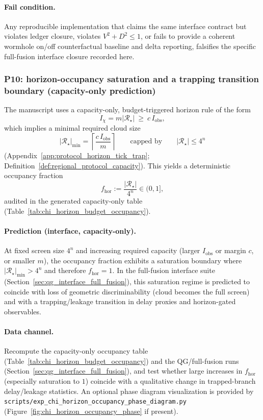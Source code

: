 \paragraph{Fail condition.}
Any reproducible implementation that claims the same interface contract but violates ledger closure, violates $V^2+D^2\le 1$, or fails to provide a coherent wormhole on/off counterfactual baseline and delta reporting,
falsifies the specific full-fusion interface closure recorded here.

\subsubsection{P10: horizon-occupancy saturation and a trapping transition boundary (capacity-only prediction)}
\label{subsec:p10_horizon_saturation_trapping}
The manuscript uses a capacity-only, budget-triggered horizon rule of the form
\[
I_{\chi}=m|\mathcal{R}_\star|\ \ge\ c\,I_{\mathrm{obs}},
\]
which implies a minimal required cloud size
\[
|\mathcal{R}_\star|_{\min}=\left\lceil \frac{c\,I_{\mathrm{obs}}}{m}\right\rceil
\qquad\text{capped by}\qquad
|\mathcal{R}_\star|\le 4^n
\]
(Appendix~\ref{app:protocol_horizon_tick_trap}; Definition~\ref{def:regional_protocol_capacity}).
This yields a deterministic occupancy fraction
\[
f_{\mathrm{hor}}:=\frac{|\mathcal{R}_\star|}{4^n}\in(0,1],
\]
audited in the generated capacity-only table (Table~\ref{tab:chi_horizon_budget_occupancy}).

\paragraph{Prediction (interface, capacity-only).}
At fixed screen size $4^n$ and increasing required capacity (larger $I_{\mathrm{obs}}$ or margin $c$, or smaller $m$), the occupancy fraction exhibits a saturation boundary where $|\mathcal{R}_\star|_{\min}>4^n$ and therefore $f_{\mathrm{hor}}=1$.
In the full-fusion interface suite (Section~\ref{sec:qg_interface_full_fusion}), this saturation regime is predicted to coincide with loss of geometric discriminability (cloud becomes the full screen) and with a trapping/leakage transition in delay proxies and horizon-gated observables.

\paragraph{Data channel.}
Recompute the capacity-only occupancy table (Table~\ref{tab:chi_horizon_budget_occupancy}) and the QG/full-fusion runs (Section~\ref{sec:qg_interface_full_fusion}), and test whether large increases in $f_{\mathrm{hor}}$ (especially saturation to $1$) coincide with a qualitative change in trapped-branch delay/leakage statistics.
An optional phase diagram visualization is provided by \texttt{scripts/exp\_chi\_horizon\_occupancy\_phase\_diagram.py} (Figure~\ref{fig:chi_horizon_occupancy_phase} if present).

